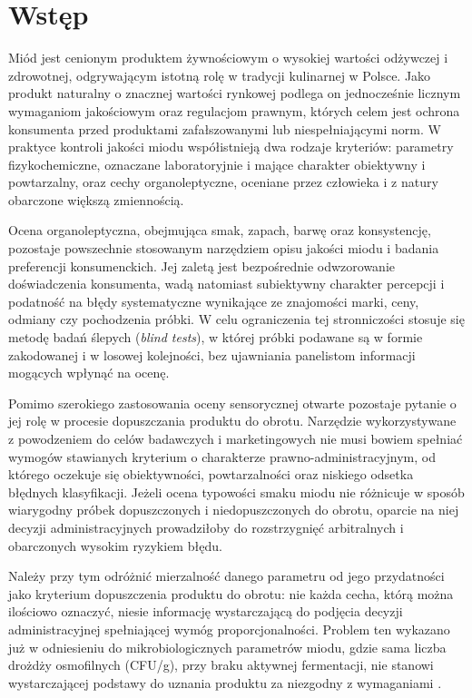\documentclass[12pt,a4paper]{article}
\begin{document}
\section{Wstęp}

Miód jest cenionym produktem żywnościowym o wysokiej wartości odżywczej
i zdrowotnej, odgrywającym istotną rolę w tradycji kulinarnej w Polsce.
Jako produkt naturalny o znacznej wartości rynkowej podlega on jednocześnie
licznym wymaganiom jakościowym oraz regulacjom prawnym, których celem jest
ochrona konsumenta przed produktami zafałszowanymi lub niespełniającymi norm.
W praktyce kontroli jakości miodu współistnieją dwa rodzaje kryteriów:
parametry fizykochemiczne, oznaczane laboratoryjnie i mające charakter
obiektywny i powtarzalny, oraz cechy organoleptyczne, oceniane przez człowieka
i z natury obarczone większą zmiennością.

Ocena organoleptyczna, obejmująca smak, zapach, barwę oraz konsystencję,
pozostaje powszechnie stosowanym narzędziem opisu jakości miodu i badania
preferencji konsumenckich. Jej zaletą jest bezpośrednie odwzorowanie
doświadczenia konsumenta, wadą natomiast subiektywny charakter percepcji
i podatność na błędy systematyczne wynikające ze znajomości marki, ceny,
odmiany czy pochodzenia próbki. W celu ograniczenia tej stronniczości stosuje
się metodę badań ślepych (\emph{blind tests}), w której próbki podawane są
w formie zakodowanej i w losowej kolejności, bez ujawniania panelistom
informacji mogących wpłynąć na ocenę.

Pomimo szerokiego zastosowania oceny sensorycznej otwarte pozostaje pytanie
o jej rolę w procesie dopuszczania produktu do obrotu. Narzędzie wykorzystywane
z powodzeniem do celów badawczych i marketingowych nie musi bowiem spełniać
wymogów stawianych kryterium o charakterze prawno-administracyjnym, od którego
oczekuje się obiektywności, powtarzalności oraz niskiego odsetka błędnych
klasyfikacji. Jeżeli ocena typowości smaku miodu nie różnicuje w sposób wiarygodny
próbek dopuszczonych i niedopuszczonych do obrotu, oparcie na niej decyzji
administracyjnych prowadziłoby do rozstrzygnięć arbitralnych i obarczonych
wysokim ryzykiem błędu.

Należy przy tym odróżnić mierzalność danego parametru od jego przydatności
jako kryterium dopuszczenia produktu do obrotu: nie każda cecha, którą można
ilościowo oznaczyć, niesie informację wystarczającą do podjęcia decyzji
administracyjnej spełniającej wymóg proporcjonalności. Problem ten wykazano już
w odniesieniu do mikrobiologicznych parametrów miodu, gdzie sama liczba drożdży
osmofilnych (CFU/g),  przy braku aktywnej fermentacji, nie stanowi
wystarczającej podstawy do uznania produktu za niezgodny z wymaganiami
\cite{Gajda2026}.
\end{document}
